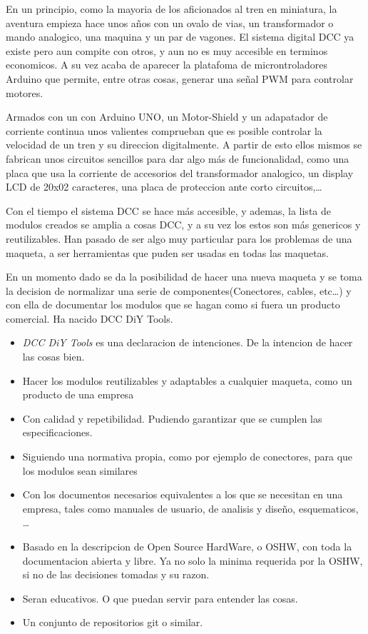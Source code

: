 
En un principio, como la mayoria de los aficionados al tren en miniatura, la aventura empieza hace unos años con un ovalo de vias,
un transformador o mando analogico, una maquina y un par de vagones. El sistema digital DCC ya existe pero aun compite con otros,
y aun no es muy accesible en terminos economicos. A su vez acaba de aparecer la platafoma de microntroladores Arduino que permite,
entre otras cosas, generar una señal PWM para controlar motores.

Armados con un con Arduino UNO, un Motor-Shield y un adapatador de corriente continua unos valientes comprueban que es posible
controlar la velocidad de un tren y su direccion digitalmente. A partir de esto ellos mismos se fabrican unos circuitos sencillos
para dar algo más de funcionalidad, como una placa que usa la corriente de accesorios del transformador analogico, un display
LCD de 20x02 caracteres, una placa de proteccion ante corto circuitos,\dots

Con el tiempo el sistema DCC se hace más accesible, y ademas, la lista de modulos creados se amplia a cosas DCC, y a su vez los estos son más
genericos y reutilizables. Han pasado de ser algo muy particular para los problemas de
una maqueta, a ser herramientas que puden ser usadas en todas las maquetas.

En un momento dado se da la posibilidad de hacer una nueva maqueta y se toma la decision de normalizar una serie de componentes(Conectores, cables, etc\dots) y con ella de documentar los modulos que se hagan
como si fuera un producto comercial. Ha nacido DCC DiY Tools.
\begin{itemize}
    \item \textit{DCC DiY Tools} es una declaracion de intenciones. De la intencion de hacer las cosas bien.
    \item Hacer los modulos reutilizables y adaptables a cualquier maqueta, como un producto de una empresa
    \item Con calidad y repetibilidad. Pudiendo garantizar que se cumplen las especificaciones. 
    \item Siguiendo una normativa propia, como por ejemplo de conectores, para que los modulos sean similares
    \item Con los documentos necesarios equivalentes a los que se necesitan en una empresa, tales como manuales de usuario, de 
    analisis y diseño, esquematicos, \dots
    \item Basado en la descripcion de Open Source HardWare, o OSHW, con toda la documentacion abierta y libre. Ya no solo la 
    minima requerida por la OSHW, si no de las decisiones tomadas y su razon.
    \item Seran educativos. O que puedan servir para entender las cosas.
    \item Un conjunto de repositorios git o similar.
\end{itemize}

